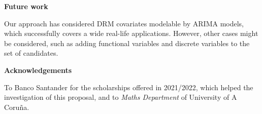 \documentclass[twoside]{article}
\begin{document}
\begin{center}
    \textbf{Future work}
\end{center}
Our approach has considered DRM covariates modelable by ARIMA models, which successfully covers a wide real-life applications. However, other cases might be considered, such as adding functional variables and discrete variables to the set of candidates. 

\begin{center}
    \textbf{Acknowledgements}
\end{center}
To Banco Santander for the scholarships offered in 2021/2022, which helped the investigation of this proposal, and to \textit{Maths Department} of University of A Coruña.




\end{document}

